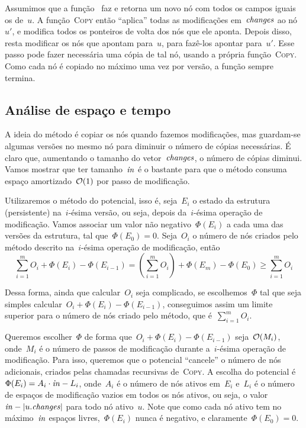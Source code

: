 \documentclass[../../main.tex]{subfiles}
\begin{document}

Assumimos que a função~ faz e retorna um novo nó com todos os campos iguais os de~$u$.
A função~\textsc{Copy} então ``aplica'' todas as modificações em~$\mathit{changes}$ ao nó~$u'$, e modifica todos os ponteiros de volta dos nós que ele aponta. Depois disso, resta modificar os nós que apontam para~$u$, para fazê-los apontar para~$u'$. Esse passo pode fazer necessária uma cópia de tal nó, usando a própria função~\textsc{Copy}. Como cada nó é copiado no máximo uma vez por versão, a função sempre termina.

\subsection{Análise de espaço e tempo}

A ideia do método é copiar os nós quando fazemos modificações, mas guardam-se algumas versões no mesmo nó para diminuir o número de cópias necessárias. É claro que, aumentando o tamanho do vetor~$\mathit{changes}$, o número de cópias diminui. Vamos mostrar que ter tamanho~$\mathit{in}$ é o bastante para que o método consuma espaço amortizado~$\mathcal{O}(1)$ por passo de modificação.

Utilizaremos o método do potencial, isso é, seja~$E_i$ o estado da estrutura (persistente) na~$i$-ésima versão, ou seja, depois da~$i$-ésima operação de modificação. Vamos associar um valor não negativo~$\Phi(E_i)$ a cada uma das versões da estrutura, tal que~$\Phi(E_0) = 0$. Seja~$O_i$ o número de nós criados pelo método descrito na~$i$-ésima operação de modificação, então
$$ \sum\limits_{i=1}^{m}{O_i + \Phi(E_i) - \Phi(E_{i-1})} = \left(\sum\limits_{i=1}^m{O_i}\right) + \Phi(E_m) - \Phi(E_0) \geq \sum\limits_{i=1}^m{O_i} $$

Dessa forma, ainda que calcular~$O_i$ seja complicado, se escolhemos~$\Phi$ tal que seja simples calcular~${O_i + \Phi(E_i) - \Phi(E_{i-1})}$, conseguimos assim um limite superior para o número de nós criado pelo método, que é~$\sum\limits_{i=1}^m{O_i}$.

Queremos escolher~$\Phi$ de forma que~${O_i + \Phi(E_i) - \Phi(E_{i-1})}$ seja~$\mathcal{O}(M_i)$, onde~$M_i$ é o número de passos de modificação durante a~$i$-ésima operação de modificação. Para isso, queremos que o potencial ``cancele'' o número de nós adicionais, criados pelas chamadas recursivas de~\textsc{Copy}. A escolha do potencial é~$\Phi(E_i) = A_i \cdot \mathit{in} - L_i$, onde~$A_i$ é o número de nós ativos em~$E_i$ e~$L_i$ é o número de espaços de modificação vazios em todos os nós ativos, ou seja, o valor~$\mathit{in} - |u.\mathit{changes}|$ para todo nó ativo~$u$. Note que como cada nó ativo tem no máximo~$\mathit{in}$ espaços livres,~$\Phi(E_i)$ nunca é negativo, e claramente~$\Phi(E_0) = 0$.
\end{document}
